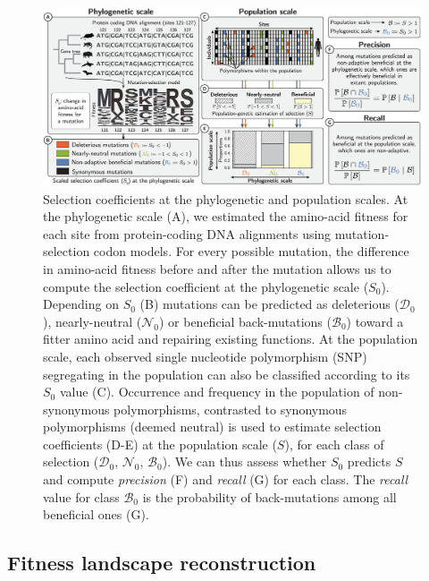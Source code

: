 \documentclass[9pt,twocolumn,twoside,lineno]{pnas-new}
\newcommand{\Sphy}{S_{0}}
\newcommand{\SphyDel}{\mathcal{D}_0}
\newcommand{\SphyNeu}{\mathcal{N}_0}
\newcommand{\SphyBen}{\mathcal{B}_0}
\newcommand{\Spop}{S}
\begin{document}
\begin{figure}[htb]
       \centering
       \includegraphics[width=17.8cm, page=1]{figure2}
       \caption{
              Selection coefficients at the phylogenetic and population scales.
              At the phylogenetic scale (A), we estimated the amino-acid fitness for each site from protein-coding DNA alignments using mutation-selection codon models.
              For every possible mutation, the difference in amino-acid fitness before and after the mutation allows us to compute the selection coefficient at the phylogenetic scale ($\Sphy$).
              Depending on $\Sphy$ (B) mutations can be predicted as deleterious ($\SphyDel$), nearly-neutral ($\SphyNeu$) or beneficial back-mutations ($\SphyBen$) toward a fitter amino acid and repairing existing functions.
              At the population scale, each observed single nucleotide polymorphism (SNP) segregating in the population can also be classified according to its $\Sphy$ value (C).
              Occurrence and frequency in the population of non-synonymous polymorphisms, contrasted to synonymous polymorphisms (deemed neutral) is used to estimate selection coefficients (D-E) at the population scale ($\Spop$), for each class of selection ($\SphyDel$, $\SphyNeu$, $\SphyBen$).
              We can thus assess whether $\Sphy$ predicts $\Spop$ and compute \textit{precision} (F) and \textit{recall} (G) for each class.
              The \textit{recall} value for class $\SphyBen$ is the probability of back-mutations among all beneficial ones (G).
       }
       \label{fig:method}
\end{figure}

\subsection*{Fitness landscape reconstruction}
\end{document}
